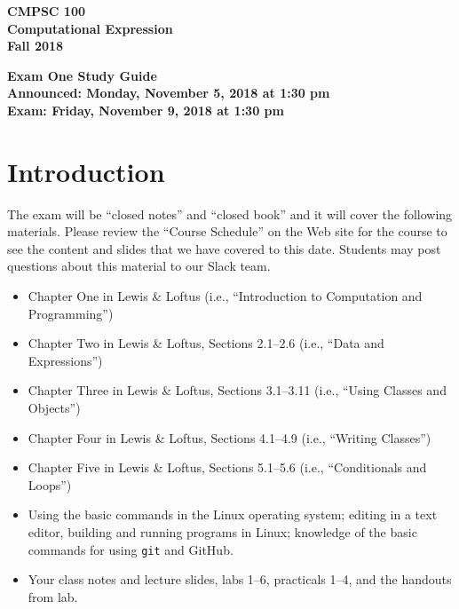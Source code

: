 \documentclass[11pt]{article}
\newcommand{\assignmentduedate}{November 9}
\newcommand{\assignmentassignedate}{November 5}
\newcommand{\assignmentnumber}{One}
\newcommand{\labyear}{2018}
\newcommand{\assignedday}{Monday}
\newcommand{\dueday}{Friday}
\newcommand{\labtime}{1:30 pm}
\newcommand{\assigneddate}{Announced: \assignedday, \assignmentassignedate, \labyear{} at \labtime{}}
\newcommand{\duedate}{Exam: \dueday, \assignmentduedate, \labyear{} at \labtime{}}
\newcommand{\guidetitle}[1]
{
  \begin{center}
    \begin{center}
      \bf
      CMPSC 100\\Computational Expression\\
      Fall 2018\\
      \medskip
    \end{center}
    \bf
    #1
  \end{center}
}
\begin{document}
\thispagestyle{empty}

\guidetitle{Exam \assignmentnumber{} Study Guide \\ \assigneddate{} \\ \duedate{}}

\section*{Introduction}

\noindent
The exam will be ``closed notes'' and ``closed book'' and it will cover the
following materials. Please review the ``Course Schedule'' on the Web site for
the course to see the content and slides that we have covered to this date.
Students may post questions about this material to our Slack team.

\begin{itemize}

  \itemsep 0in

  \item Chapter One in Lewis \& Loftus (i.e., ``Introduction to Computation and
    Programming'')

  \item Chapter Two in Lewis \& Loftus, Sections 2.1--2.6 (i.e., ``Data and
    Expressions'')

  \item Chapter Three in Lewis \& Loftus, Sections 3.1--3.11 (i.e., ``Using
    Classes and Objects'')


  \item Chapter Four in Lewis \& Loftus, Sections 4.1--4.9 (i.e., ``Writing
    Classes'')

  \item Chapter Five in Lewis \& Loftus, Sections 5.1--5.6 (i.e., ``Conditionals
    and Loops'')

  \item Using the basic commands in the Linux operating system; editing in a
    text editor, building and running programs in Linux; knowledge of the basic
    commands for using {\tt git} and GitHub.


  \item Your class notes and lecture slides, labs 1--6, practicals 1--4, and the
    handouts from lab.

\end{itemize}
\end{document}
